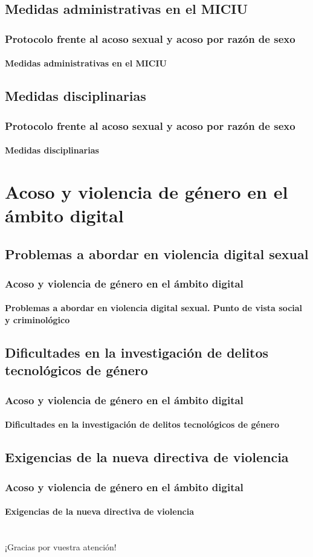 \documentclass{beamer}
\begin{document}
    \subsection{Medidas administrativas en el MICIU}
    \begin{frame}
		\frametitle{Protocolo frente al acoso sexual y acoso por razón de sexo}
        \framesubtitle{Medidas administrativas en el MICIU}
	\end{frame}

    \subsection{Medidas disciplinarias}
    \begin{frame}
		\frametitle{Protocolo frente al acoso sexual y acoso por razón de sexo}
        \framesubtitle{Medidas disciplinarias}
	\end{frame}

    \section{Acoso y violencia de género en el ámbito digital}

    \subsection{Problemas a abordar en violencia digital sexual}
    \begin{frame}
		\frametitle{Acoso y violencia de género en el ámbito digital}
        \framesubtitle{Problemas a abordar en violencia digital sexual. Punto de vista social y criminológico}
	\end{frame}

    \subsection{Dificultades en la investigación de delitos tecnológicos de género}
    \begin{frame}
		\frametitle{Acoso y violencia de género en el ámbito digital}
        \framesubtitle{Dificultades en la investigación de delitos tecnológicos de género}
	\end{frame}

    \subsection{Exigencias de la nueva directiva de violencia}
    \begin{frame}
		\frametitle{Acoso y violencia de género en el ámbito digital}
        \framesubtitle{Exigencias de la nueva directiva de violencia}
	\end{frame}

    \section{}
    \subsection{}

	\begin{frame}
        \begin{block}{}
			\centering
			¡Gracias por vuestra atención!
		\end{block}
	\end{frame}
\end{document}
